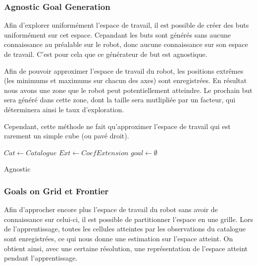 \documentclass[11pt,french]{report}
\begin{document}
\subsubsection{Agnostic Goal Generation}

Afin d'explorer uniformément l'espace de travail, il est possible de créer des buts uniformément sur cet espace.
Cepandant les buts sont générés sans aucune connaissance au préalable sur le robot, donc aucune connaissance sur son espace de travail.
C'est pour cela que ce générateur de but est agnostique.

\phantom{INVISIBLE LINE}

Afin de pouvoir approximer l'espace de travail du robot, les positions extrêmes (les minimums et maximums sur chacun des axes) sont enregistrées.
En résultat nous avons une zone que le robot peut potentiellement atteindre.
Le prochain but sera généré dans cette zone, dont la taille sera mutlipliée par un facteur, qui déterminera ainsi le taux d'exploration.

\phantom{INVISIBLE LINE}

Cependant, cette méthode ne fait qu'approximer l'espace de travail qui est rarement un simple cube (ou pavé droit).

\begin{algorithm}[h]
    \DontPrintSemicolon
    \LinesNumbered
    $Cat \leftarrow Catalogue$ \;
    $Ext \leftarrow CoefExtension$ \;
    $goal \leftarrow \emptyset$ \;
    \caption{\label{alg:Agnostic} Agnostic}
\end{algorithm}

\pagebreak

\subsubsection{Goals on Grid et Frontier}

Afin d'approcher encore plus l'espace de travail du robot sans avoir de connaissance sur celui-ci, il est possible de partitionner l'espace en une grille.
Lors de l'apprentissage, toutes les cellules atteintes par les observations du catalogue sont enregistrées, ce qui nous donne une estimation sur l'espace atteint.
On obtient ainsi, avec une certaine résolution, une représentation de l'espace atteint pendant l'apprentissage.
\end{document}
